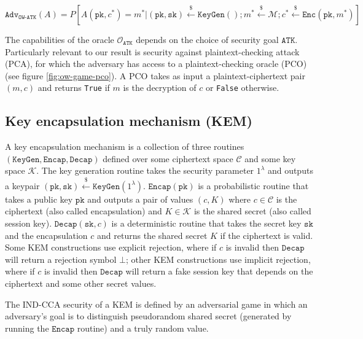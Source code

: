 \documentclass[journal=tches,submission]{iacrtrans}
\newcommand{\keygen}{\texttt{KeyGen}}
\newcommand{\encrypt}{\texttt{Enc}}
\newcommand{\encap}{\texttt{Encap}}
\newcommand{\decap}{\texttt{Decap}}
\newcommand{\pk}{\texttt{pk}}
\newcommand{\sk}{\texttt{sk}}
\newcommand{\leftsample}{\stackrel{\$}{\leftarrow}}
\newcommand{\adv}{\texttt{Adv}}
\begin{document}
\begin{equation*}
    \adv_\texttt{OW-ATK}(A) = P\left[
        A(\pk, c^\ast) = m^\ast \vert
        (\pk, \sk) \leftsample \keygen() ;
        m^\ast \leftsample \mathcal{M};
        c^\ast \leftsample \encrypt(\pk, m^\ast)
    \right]
\end{equation*}

The capabilities of the oracle $\mathcal{O}_\texttt{ATK}$ depends on the choice of security goal $\texttt{ATK}$. Particularly relevant to our result is security against plaintext-checking attack (PCA), for which the adversary has access to a plaintext-checking oracle (PCO) (see figure \ref{fig:ow-game-pco}). A PCO takes as input a plaintext-ciphertext pair $(m, c)$ and returns \texttt{True} if $m$ is the decryption of $c$ or \texttt{False} otherwise.

\subsection{Key encapsulation mechanism (KEM)}
A key encapsulation mechanism is a collection of three routines $(\keygen, \encap, \decap)$ defined over some ciphertext space $\mathcal{C}$ and some key space $\mathcal{K}$. The key generation routine takes the security parameter $1^\lambda$ and outputs a keypair $(\pk, \sk) \leftsample \keygen(1^\lambda)$. $\encap(\pk)$ is a probabilistic routine that takes a public key $\pk$ and outputs a pair of values $(c, K)$ where $c \in \mathcal{C}$ is the ciphertext (also called encapsulation) and $K \in \mathcal{K}$ is the shared secret (also called session key). $\decap(\sk, c)$ is a deterministic routine that takes the secret key $\sk$ and the encapsulation $c$ and returns the shared secret $K$ if the ciphertext is valid. Some KEM constructions use explicit rejection, where if $c$ is invalid then $\decap$ will return a rejection symbol $\bot$; other KEM constructions use implicit rejection, where if $c$ is invalid then $\decap$ will return a fake session key that depends on the ciphertext and some other secret values.

The IND-CCA security of a KEM is defined by an adversarial game in which an adversary's goal is to distinguish pseudorandom shared secret (generated by running the $\encap$ routine) and a truly random value.
\end{document}
